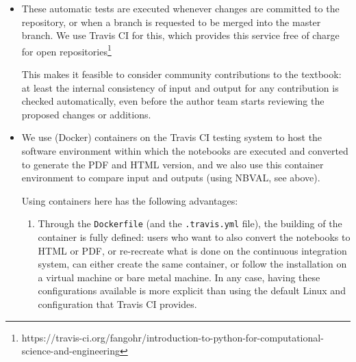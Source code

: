 \documentclass{deliverablereport}
\begin{document}
{{{\begin{itemize}
  In the context of this textbook, there are two common sources for
  deviations reported by \nbval:
  \begin{enumerate}
  \item Changes in the chapter have had (unexpected) side effects
    later in the chapter, combined with a failure to re-execute the
    whole chapter manually to check for such deviations after the
    changes were introduced.
  \item Changes in libraries we depend on: for example, the change to
    Matplotlib version 3 has introduced new behaviour of Matplotlib,
    which resulted in different outputs.
  \end{enumerate}

\item These automatic tests are executed whenever changes are
  committed to the repository, or when a branch is requested to be
  merged into the master branch. We use Travis CI for this, which
  provides this service free of charge for open repositories\footnote{
  https://travis-ci.org/fangohr/introduction-to-python-for-computational-science-and-engineering}

  This makes it feasible to consider community contributions to the
  textbook: at least the internal consistency of input and output for
  any contribution is checked automatically, even before the author
  team starts reviewing the proposed changes or additions.

\item We use (Docker) containers on the Travis CI testing system to
  host the software environment within which the notebooks are
  executed and converted to generate the PDF and HTML version, and we
  also use this container environment to compare input and outputs
  (using NBVAL, see above).

  Using containers here has the following advantages:
  \begin{enumerate}
  \item Through the \texttt{Dockerfile} (and the \texttt{.travis.yml}
    file), the building of the container is fully defined: users who
    want to also convert the notebooks to HTML or PDF, or re-recreate
    what is done on the continuous integration system, can either
    create the same container, or follow the installation on a virtual
    machine or bare metal machine. In any case, having these
    configurations available is more explicit than using the default
    Linux and configuration that Travis CI provides.


\end{enumerate}
\end{itemize}}}}
\end{document}

